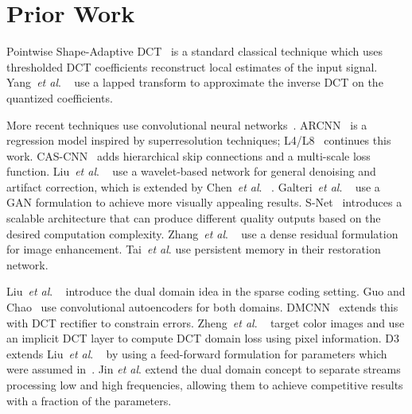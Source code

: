 \documentclass[runningheads]{llncs}
\newcommand{\etal}{\textit{et al}. }
\begin{document}
\section{Prior Work}

Pointwise 
Shape-Adaptive DCT~\cite{foi2006pointwise} is a standard classical technique which uses thresholded
DCT coefficients reconstruct local estimates of the input signal. Yang~\etal~\cite{yang2000blocking} use a 
lapped transform to approximate the inverse DCT on the quantized coefficients.

More recent techniques use convolutional neural networks~\cite{lecun1990handwritten, sutskever2012imagenet}.
ARCNN~\cite{dong2015compression} is a regression model inspired 
by superresolution techniques; L4/L8~\cite{svoboda2016compression} continues this work. CAS-CNN~\cite{cavigelli2017cas} adds hierarchical skip connections and a 
multi-scale loss function. Liu~\etal~\cite{liu2018multi} use a wavelet-based network 
for general denoising and artifact correction, which is extended by Chen~\etal~\cite{chen2018dpw}. Galteri~\etal~\cite{galteri2017deep} use a GAN formulation to
achieve more visually appealing results. S-Net~\cite{zheng2018s} introduces a scalable architecture that can produce
different quality outputs based on the desired computation complexity. Zhang~\etal~\cite{zhang2020residual} use a dense residual formulation for image enhancement. Tai~\etal 
\cite{tai2017memnet} use persistent memory in their restoration network.

Liu~\etal~\cite{liu2015data} introduce the dual domain idea in the sparse coding setting. Guo and Chao~\cite{guo2016building}
use convolutional autoencoders for both domains. DMCNN~\cite{zhang2018dmcnn} extends this with DCT rectifier to
constrain errors. Zheng~\etal~\cite{zheng2019implicit} target color images and use an implicit DCT layer
to compute DCT domain loss using pixel information. D3~\cite{wang2016d3} extends Liu~\etal~\cite{liu2015data}
by using a feed-forward formulation for parameters which were assumed in~\cite{liu2015data}. Jin \etal \cite{jin2020dual} extend the dual domain concept to separate streams processing low and high frequencies, allowing them to achieve competitive results with a fraction of the parameters. 
\end{document}
